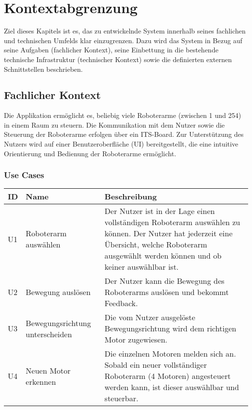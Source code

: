 \chapter{Kontextabgrenzung}
Ziel dieses Kapitels ist es, das zu entwickelnde System innerhalb seines fachlichen und technischen Umfelds klar einzugrenzen. Dazu wird das System in Bezug auf seine Aufgaben (fachlicher Kontext), seine Einbettung in die bestehende technische Infrastruktur (technischer Kontext) sowie die definierten externen Schnittstellen beschrieben.

\section{Fachlicher Kontext}


Die Applikation ermöglicht es, beliebig viele Roboterarme (zwischen 1 und 254) in einem Raum zu steuern. Die Kommunikation mit dem Nutzer sowie die Steuerung der Roboterarme erfolgen über ein ITS-Board. 
Zur Unterstützung des Nutzers wird auf einer Benutzeroberfläche (UI) bereitgestellt, die eine intuitive Orientierung und Bedienung der Roboterarme ermöglicht.

\subsection{Use Cases}
\begin{tabular}{|p{1.5cm}|p{4cm}|p{8.5cm}|}
	\hline
	\textbf{ID} & \textbf{Name} & \textbf{Beschreibung} \\
	\hline
	U1 & Roboterarm auswählen & Der Nutzer ist in der Lage einen vollständigen Roboterarm auswählen zu können. Der Nutzer hat jederzeit eine Übersicht, welche Roboterarm ausgewählt werden können und ob keiner auswählbar ist. \\
	\hline
	U2 & Bewegung auslösen & Der Nutzer kann die Bewegung des Roboterarms auslösen und bekommt Feedback. \\
	\hline
	U3 & Bewegungsrichtung unterscheiden & Die vom Nutzer ausgelöste Bewegungsrichtung wird dem richtigen Motor zugewiesen. \\
	\hline
	U4 & Neuen Motor erkennen & Die einzelnen Motoren melden sich an. Sobald ein neuer vollständiger Roboterarm (4 Motoren) angesteuert werden kann, ist dieser auswählbar und steuerbar. \\
	\hline
	
	
		
\end{tabular}

